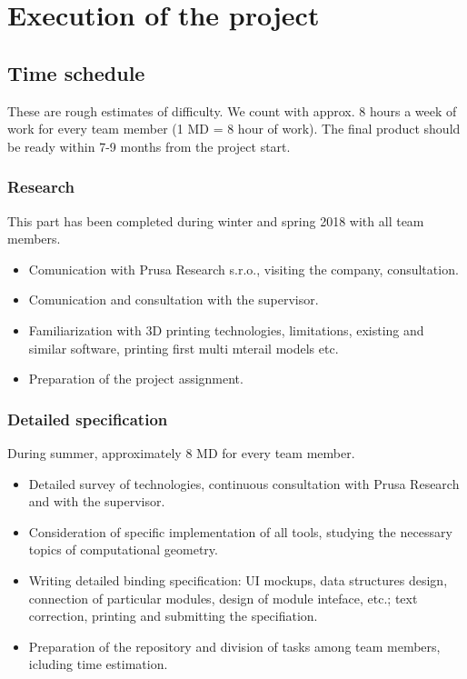 \chapter{Execution of the project}

\section{Time schedule}

These are rough estimates of difficulty. We count with approx. 8 hours a week of work for every team member (1 MD = 8 hour of work). The final product should be ready within 7-9 months from the project start.


\subsection{Research}

This part has been completed during winter and spring 2018 with all team members.

\begin{itemize}
\item Comunication with Prusa Research s.r.o., visiting the company, consultation.
\item Comunication and consultation with the supervisor.
\item Familiarization with 3D printing technologies, limitations, existing and similar software, printing first multi mterail models etc. 
\item Preparation of the project assignment.
\end{itemize}


\subsection{Detailed specification}

During summer, approximately 8 MD for every team member.

\begin{itemize}
\item Detailed survey of technologies, continuous consultation with Prusa Research and with the supervisor.
\item Consideration of specific implementation of all tools, studying the necessary topics of computational geometry.
\item Writing detailed binding specification: UI mockups, data structures design, connection of particular modules, design of module inteface, etc.; text correction, printing and submitting the specifiation.
\item Preparation of the repository and division of tasks among team members, icluding time estimation.
\end{itemize}



